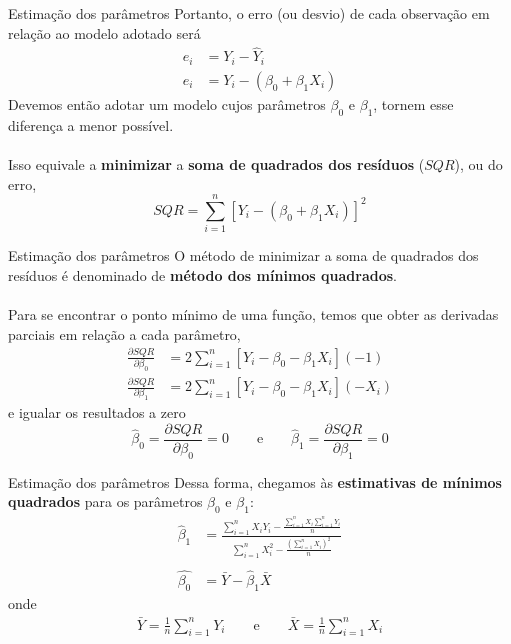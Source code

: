 \documentclass[10pt]{beamer}\usepackage[]{graphicx}\usepackage[]{color}
\theoremstyle{definition}
\begin{document}
\begin{frame}[fragile]{Estimação dos parâmetros}
  Portanto, o erro (ou desvio) de cada observação em relação ao modelo
  adotado será
  \begin{align*}
    e_i &= Y_i - \hat{Y}_i \\
    e_i &= Y_i - (\beta_0 + \beta_1 X_i)
  \end{align*}
  Devemos então adotar um modelo cujos parâmetros $\beta_0$ e
  $\beta_1$, tornem esse diferença a menor possível. \\~\\
  Isso equivale a \textbf{minimizar} a \textbf{soma de quadrados dos
  resíduos} ($SQR$), ou do erro,
  \begin{equation*}
  SQR = \sum_{i=1}^{n} [Y_i - (\beta_0 + \beta_1 X_i)]^2
\end{equation*}
\end{frame}

\begin{frame}[fragile]{Estimação dos parâmetros}
  O método de minimizar a soma de quadrados dos resíduos é denominado de
  \textbf{método dos mínimos quadrados}. \\~\\
  Para se encontrar o ponto mínimo de uma função, temos que obter as
  derivadas parciais em relação a cada parâmetro,
  \begin{align*}
    \frac{\partial SQR}{\partial \beta_0} &= 2 \sum_{i=1}^{n} [Y_i -
    \beta_0 - \beta_1 X_i] (-1) \\
    \frac{\partial SQR}{\partial \beta_1} &= 2 \sum_{i=1}^{n} [Y_i -
    \beta_0 - \beta_1 X_i] (-X_i)
  \end{align*}
  e igualar os resultados a zero
  \begin{equation*}
    \hat{\beta}_0 = \frac{\partial SQR}{\partial \beta_0} = 0 \qquad
    \text{e} \qquad
    \hat{\beta}_1 = \frac{\partial SQR}{\partial \beta_1} = 0
  \end{equation*}
\end{frame}

\begin{frame}[fragile]{Estimação dos parâmetros}
  Dessa forma, chegamos às \textbf{estimativas de mínimos quadrados}
  para os parâmetros $\beta_0$ e $\beta_1$:
  \begin{align*}
    \hat{\beta}_1 &= \frac{\sum_{i=1}^{n} X_iY_i - \frac{\sum_{i=1}^{n}
        X_i \sum_{i=1}^{n} Y_i}{n}}{\sum_{i=1}^{n}X_i^2 -
      \frac{(\sum_{i=1}^{n} X_i)^2}{n}} \\
    & \\
    \hat{\beta_0} &= \bar{Y} - \hat{\beta}_1 \bar{X}
  \end{align*}
  onde
  \begin{align*}
    \bar{Y} = \frac{1}{n} \sum_{i=1}^{n} Y_i \qquad \text{e} \qquad
    \bar{X} = \frac{1}{n} \sum_{i=1}^{n} X_i
  \end{align*}
\end{frame}
\end{document}
